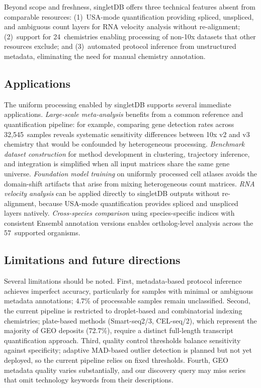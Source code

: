\documentclass[10pt,twocolumn,letterpaper]{article}
\begin{document}
Beyond scope and freshness, singletDB offers three technical features
absent from comparable resources: (1)~USA-mode quantification providing
spliced, unspliced, and ambiguous count layers for RNA velocity analysis
without re-alignment; (2)~support for 24~chemistries enabling processing
of non-10x datasets that other resources exclude; and (3)~automated
protocol inference from unstructured metadata, eliminating the need for
manual chemistry annotation.

\subsection{Applications}

The uniform processing enabled by singletDB supports several immediate
applications. \emph{Large-scale meta-analysis} benefits from a common
reference and quantification pipeline: for example, comparing gene
detection rates across 32,545~samples reveals systematic sensitivity
differences between 10x v2 and v3 chemistry that would be confounded by
heterogeneous processing. \emph{Benchmark dataset construction} for
method development in clustering, trajectory inference, and integration
is simplified when all input matrices share the same gene universe.
\emph{Foundation model training} on uniformly processed cell atlases
avoids the domain-shift artifacts that arise from mixing
heterogeneous count matrices.
\emph{RNA velocity analysis} can be applied directly to singletDB
outputs without re-alignment, because USA-mode quantification provides
spliced and unspliced layers natively.
\emph{Cross-species comparison} using species-specific indices with
consistent Ensembl annotation versions enables ortholog-level analysis
across the 57~supported organisms.

\subsection{Limitations and future directions}

Several limitations should be noted. First, metadata-based protocol
inference achieves imperfect accuracy, particularly for samples with
minimal or ambiguous metadata annotations; 4.7\% of processable samples
remain unclassified. Second, the current pipeline is restricted to
droplet-based and combinatorial indexing chemistries; plate-based methods
(Smart-seq2/3, CEL-seq/2), which represent the majority of GEO deposits
(72.7\%), require a distinct full-length transcript quantification
approach. Third, quality control thresholds balance sensitivity against
specificity; adaptive MAD-based outlier detection is planned but not yet
deployed, so the current pipeline relies on fixed thresholds. Fourth, GEO
metadata quality varies substantially, and our discovery query may miss
series that omit technology keywords from their descriptions.
\end{document}
